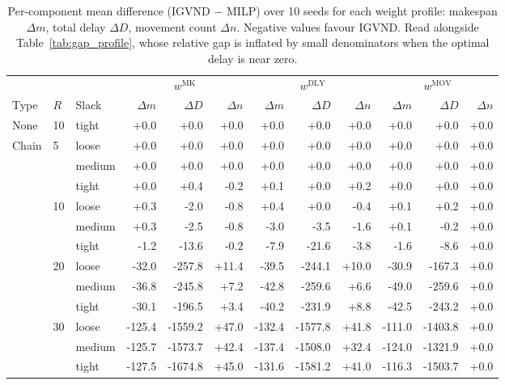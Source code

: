 \begin{table}[htbp]
  \centering
  \footnotesize
  \caption{Per-component mean difference (IGVND $-$ MILP) over 10 seeds for each weight profile: makespan $\Delta m$, total delay $\Delta D$, movement count $\Delta n$. Negative values favour IGVND. Read alongside Table~\ref{tab:gap_profile}, whose relative gap is inflated by small denominators when the optimal delay is near zero.}
  \label{tab:components}
  \begin{tabular}{lll *{9}{r}}
    \toprule
    & & & \multicolumn{3}{c}{$w^{\mathrm{MK}}$} & \multicolumn{3}{c}{$w^{\mathrm{DLY}}$} & \multicolumn{3}{c}{$w^{\mathrm{MOV}}$} \\
    \cmidrule(lr){4-6}\cmidrule(lr){7-9}\cmidrule(lr){10-12}
    Type & $R$ & Slack & $\Delta m$ & $\Delta D$ & $\Delta n$ & $\Delta m$ & $\Delta D$ & $\Delta n$ & $\Delta m$ & $\Delta D$ & $\Delta n$ \\
    \midrule
    None & 10 & tight & +0.0 & +0.0 & +0.0 & +0.0 & +0.0 & +0.0 & +0.0 & +0.0 & +0.0 \\
    Chain & 5 & loose & +0.0 & +0.0 & +0.0 & +0.0 & +0.0 & +0.0 & +0.0 & +0.0 & +0.0 \\
     &  & medium & +0.0 & +0.0 & +0.0 & +0.0 & +0.0 & +0.0 & +0.0 & +0.0 & +0.0 \\
     &  & tight & +0.0 & +0.4 & -0.2 & +0.1 & +0.0 & +0.2 & +0.0 & +0.0 & +0.0 \\
     & 10 & loose & +0.3 & -2.0 & -0.8 & +0.4 & +0.0 & -0.4 & +0.1 & +0.2 & +0.0 \\
     &  & medium & +0.3 & -2.5 & -0.8 & -3.0 & -3.5 & -1.6 & +0.1 & -0.2 & +0.0 \\
     &  & tight & -1.2 & -13.6 & -0.2 & -7.9 & -21.6 & -3.8 & -1.6 & -8.6 & +0.0 \\
     & 20 & loose & -32.0 & -257.8 & +11.4 & -39.5 & -244.1 & +10.0 & -30.9 & -167.3 & +0.0 \\
     &  & medium & -36.8 & -245.8 & +7.2 & -42.8 & -259.6 & +6.6 & -49.0 & -259.6 & +0.0 \\
     &  & tight & -30.1 & -196.5 & +3.4 & -40.2 & -231.9 & +8.8 & -42.5 & -243.2 & +0.0 \\
     & 30 & loose & -125.4 & -1559.2 & +47.0 & -132.4 & -1577.8 & +41.8 & -111.0 & -1403.8 & +0.0 \\
     &  & medium & -125.7 & -1573.7 & +42.4 & -137.4 & -1508.0 & +32.4 & -124.0 & -1321.9 & +0.0 \\
     &  & tight & -127.5 & -1674.8 & +45.0 & -131.6 & -1581.2 & +41.0 & -116.3 & -1503.7 & +0.0 \\

\end{tabular}
\end{table}
